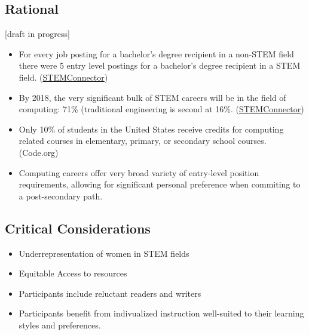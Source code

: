 \documentclass[letterpaper,10pt,english]{sphinxmanual}
\begin{document}
\subsection{Rational}
\label{philosophy:rational}
{[}draft in progress{]}
\begin{itemize}
\item {} 
For every job posting for a bachelor's degree recipient in a non-STEM field there were 5 entry level postings for a bachelor's degree recipient in a STEM field. (\href{http://www.stemconnector.org/sites/default/files/store/STEM-Students-STEM-Jobs-Executive-Summary.pdf}{STEMConnector})

\item {} 
By 2018, the very significant bulk of STEM careers will be in the field of computing: 71\% (traditional engineering is second at 16\%. (\href{http://www.stemconnector.org/sites/default/files/store/STEM-Students-STEM-Jobs-Executive-Summary.pdf}{STEMConnector})

\item {} 
Only 10\% of students in the United States receive credits for computing related courses in elementary, primary, or secondary school courses. (Code.org)

\item {} 
Computing careers offer very broad variety of entry-level position requirements, allowing for significant personal preference when commiting to a post-secondary path.

\end{itemize}


\subsection{Critical Considerations}
\label{philosophy:critical-considerations}\begin{itemize}
\item {} 
Underrepresentation of women in STEM fields

\item {} 
Equitable Access to resources

\item {} 
Participants include reluctant readers and writers

\item {} 
Participants benefit from indivualized instruction well-suited to their learning styles and preferences.

\end{itemize}
\end{document}
